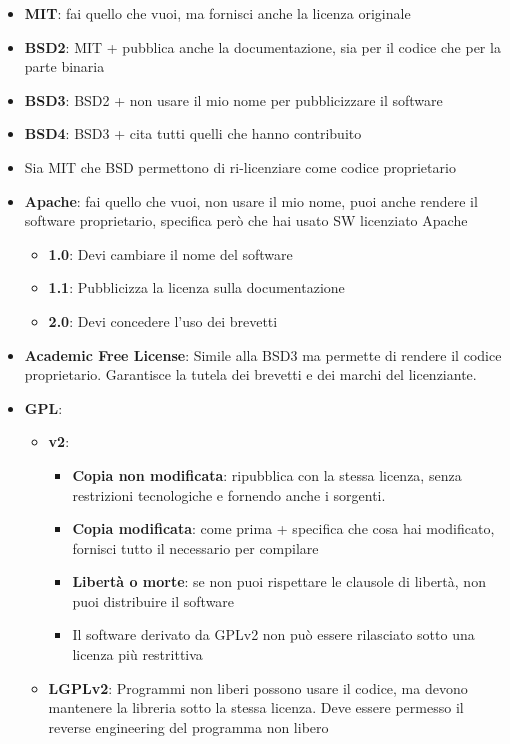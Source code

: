 \begin{itemize}
	\item \textbf{MIT}: fai quello che vuoi, ma fornisci anche la licenza originale
	\item \textbf{BSD2}: MIT + pubblica anche la documentazione, sia per il codice che per la parte binaria
	\item \textbf{BSD3}: BSD2 + non usare il mio nome per pubblicizzare il software
	\item \textbf{BSD4}: BSD3 + cita tutti quelli che hanno contribuito
	\item Sia MIT che BSD permettono di ri-licenziare come codice proprietario
	\item \textbf{Apache}: fai quello che vuoi, non usare il mio nome, puoi anche rendere il software proprietario, specifica però che hai usato SW licenziato Apache
		\begin{itemize}
			\item \textbf{1.0}: Devi cambiare il nome del software
			\item \textbf{1.1}: Pubblicizza la licenza sulla documentazione
			\item \textbf{2.0}: Devi concedere l’uso dei brevetti
		\end{itemize}
	\item \textbf{Academic Free License}: Simile alla BSD3 ma permette di rendere il codice proprietario. Garantisce la tutela dei brevetti e dei marchi del licenziante.
	\item \textbf{GPL}:
		\begin{itemize}
			\item \textbf{v2}:
				\begin{itemize}
					\item \textbf{Copia non modificata}: ripubblica con la stessa licenza, senza restrizioni tecnologiche e fornendo anche i sorgenti.
					\item \textbf{Copia modificata}: come prima + specifica che cosa hai modificato, fornisci tutto il necessario per compilare
					\item \textbf{Libertà o morte}: se non puoi rispettare le clausole di libertà, non puoi distribuire il software
					\item Il software derivato da GPLv2 non può essere rilasciato sotto una licenza più restrittiva
				\end{itemize}
			\item \textbf{LGPLv2}: Programmi non liberi possono usare il codice, ma devono mantenere la libreria sotto la stessa licenza. Deve essere permesso il reverse engineering del programma non libero

\end{itemize}
\end{itemize}
